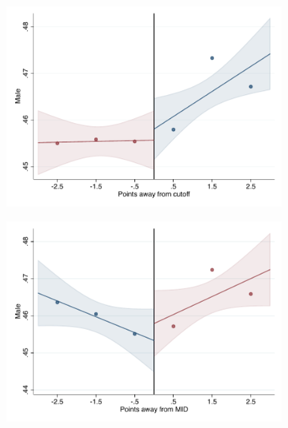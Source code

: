 \documentclass[oneside,11pt]{article}
\begin{document}
\begin{figure}[H]
\begin{center}
    \begin{subfigure}{0.475\textwidth}
        \centering
        \includegraphics[width=\textwidth]{04_Figures/rd_plot_tau_hombre_UNAM3.pdf}
    \end{subfigure}
    \begin{subfigure}{0.475\textwidth}
        \centering
        \includegraphics[width=\textwidth]{04_Figures/rd_plot_mid_hombre_UNAM3.pdf}
    \end{subfigure}


\end{center}
\end{figure}
\end{document}
